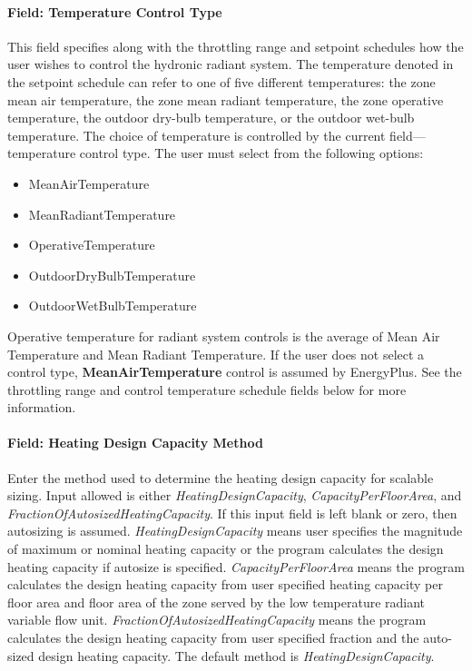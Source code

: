 \paragraph{Field: Temperature Control Type}\label{field-temperature-control-type}

This field specifies along with the throttling range and setpoint schedules how the user wishes to control the hydronic radiant system. The temperature denoted in the setpoint schedule can refer to one of five different temperatures: the zone mean air temperature, the zone mean radiant temperature, the zone operative temperature, the outdoor dry-bulb temperature, or the outdoor wet-bulb temperature. The choice of temperature is controlled by the current field---temperature control type. The user must select from the following options:

\begin{itemize}
\item
  MeanAirTemperature
\item
  MeanRadiantTemperature
\item
  OperativeTemperature
\item
  OutdoorDryBulbTemperature
\item
  OutdoorWetBulbTemperature
\end{itemize}

Operative temperature for radiant system controls is the average of Mean Air Temperature and Mean Radiant Temperature. If the user does not select a control type, \textbf{MeanAirTemperature} control is assumed by EnergyPlus. See the throttling range and control temperature schedule fields below for more information.

\paragraph{Field: Heating Design Capacity Method}\label{field-heating-design-capacity-method-5}

Enter the method used to determine the heating design capacity for scalable sizing. Input allowed is either \emph{HeatingDesignCapacity}, \emph{CapacityPerFloorArea}, and \emph{FractionOfAutosizedHeatingCapacity}. If this input field is left blank or zero, then autosizing is assumed. \emph{HeatingDesignCapacity} means user specifies the magnitude of maximum or nominal heating capacity or the program calculates the design heating capacity if autosize is specified. \emph{CapacityPerFloorArea} means the program calculates the design heating capacity from user specified heating capacity per floor area and floor area of the zone served by the low temperature radiant variable flow unit. \emph{FractionOfAutosizedHeatingCapacity} means the program calculates the design heating capacity from user specified fraction and the auto-sized design heating capacity. The default method is \emph{HeatingDesignCapacity}.

